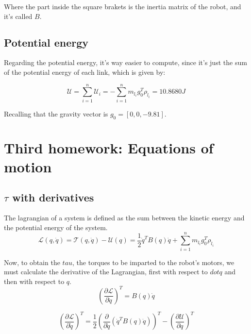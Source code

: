 \documentclass{article}
\begin{document}
Where the part inside the square brakets is the inertia matrix of the robot, and it's called $B$.



\subsection{Potential energy}

Regarding the potential energy, it's way easier to compute, since it's just the sum of the potential energy of each link, which is given by:

\begin{equation}
    \mathcal{U} = \sum_{i=1}^{n} \mathcal{U}_i = - \sum_{i=1}^{n} m_{l_i} g_0^T \rho_{l_i} =    10.8680 J
\end{equation}

Recalling that the gravity vector is $g_0 = [0, 0, -9.81]$.


\section{Third homework: Equations of motion}
\justify

\subsection{$\tau$ with derivatives}

The lagrangian of a system is defined as the sum between the kinetic energy and the potential energy of the system.
\begin{equation}
    \mathcal{L}(q, \dot{q}) = \mathcal{T}(q, \dot{q}) - \mathcal{U}(q) = \frac{1}{2} \dot{q}^T B(q) \dot{q} + \sum_{i=1}^{n} m_{l_i} g_0^T \rho_{l_i}
\end{equation}

Now, to obtain the $tau$, the torques to be imparted to the robot's motors, we must calculate the derivative of the Lagrangian, first with respect to $dot{q}$ and then with respect to $q$.
\begin{equation}
    \left( \frac{\partial \mathcal{L}}{\partial \dot{q}} \right)^T = B(q) \dot{q}
\end{equation}

\begin{equation}
    \left( \frac{\partial \mathcal{L}}{\partial \dot{q}} \right)^T = \frac{1}{2} \left( \frac{\partial}{\partial \dot{q}} \left( \dot{q}^T B(q) \dot{q} \right) \right)^T - \left( \frac{\partial \mathcal{U}}{\partial q} \right)^T
\end{equation}
\end{document}
